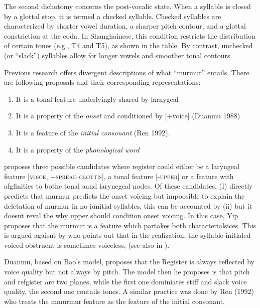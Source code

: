 \documentclass[11pt]{article}
\begin{document}
The second dichotomy concerns the post-vocalic state. When a syllable is closed by a glottal stop, it is termed a checked syllable. Checked syllables are characterized by shorter vowel duration, a sharper pitch contour, and a glottal constriction at the coda. In Shanghainese, this condition restricts the distribution of certain tones (e.g., T4 and T5), as shown in the table. By contrast, unchecked (or “slack”) syllables allow for longer vowels and smoother tonal contours.



Previous research offers divergent descriptions of what ``murmur'' entails. There are following proposals and their corresponding representations:
\begin{enumerate}
    \item It is a tonal feature underlyingly shared by larnygeal \citep{yip1993tonal}
    \item It is a property of the \textit{onset} and conditioned by [+voice] (Duanmu 1988)
    \item It is a feature of the \textit{initial consonant} (Ren 1992).  
    \item It is a property of the \textit{phonological word} \citep{zhu1999shanghai}
\end{enumerate}


\citep{yipsniderPhonologyTone1993} proposes three possible candidates where register could either be a laryngeal feature \textsc{[voice, +spread glottis]}, a tonal feature \textsc{[-upper]} or a feature with afgfinities to bothe tonal aand larynegeal nodes. Of these candidates, (I) directly predicts that murmur predicts the onset voicing but impoosible to explain the deletation of murmur in no-iunitial syllables, this can be accounted by (ii) but it doesnt reval the why upper should condition onset voicing. In this case, Yip proposes that the murmur is a feature which partakes both characterialsices. This is argued agaisnt by \citep{zhu1999shanghai} who points out that in the realization, the syllable-initialed voiced obstruent is sometimes voiceless, (see also in \citep{chen2015shanghai}).


Duanmu, based on Bao's model, proposes that the Register is always reflected by voice quality but not always by pitch. The model then he proposes is that pitch and refgister are two planes, while the first one dominiates stiff and slack voice quality, the second one contails tones. A similar practice was done by Ren (1992) who treats the mmurmur feature as the feature of the initial consonant.
\end{document}
